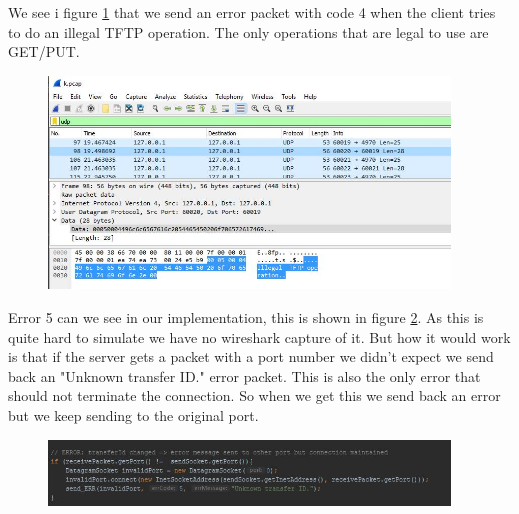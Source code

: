 \documentclass[a4paper,12pt]{article}
\numberwithin{figure}{section}
\begin{document}
\noindent We see i figure \ref{error 4} that we send an error packet with code 4 when the client tries to do an illegal TFTP operation. The only operations that are legal to use are GET/PUT. 
\begin{figure}[hp!]
	\centering
	\includegraphics[width=0.95\textwidth,keepaspectratio]{img/error4.jpg} 
	\caption{}
	\label{error 4}
\end{figure}

\noindent Error 5 can we see in our implementation, this is shown in figure \ref{error 5}. As this is quite hard to simulate we have no wireshark capture of it. But how it would work is that if the server gets a packet with a port number we didn't expect we send back an "Unknown transfer ID."\cite{RFC1350} error packet. This is also the only error that should not terminate the connection. So when we get this we send back an error but we keep sending to the original port.   

\begin{figure}[hp!]
	\centering
	\includegraphics[width=0.95\textwidth,keepaspectratio]{img/error5.jpg} 
	\caption{}
	\label{error 5}
\end{figure}
\noindent
\newpage


\end{document}
